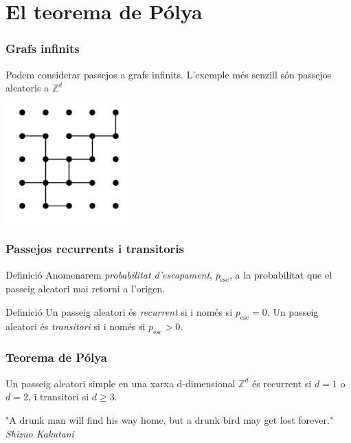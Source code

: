 \documentclass[aspectratio=169, 12pt]{beamer}
\newcommand{\Z}{\mathbb{Z}}
\begin{document}
\section{El teorema de Pólya}
\begin{frame}
	\frametitle{Grafs infinits}
	Podem considerar passejos a grafs infinits. L'exemple més senzill són passejos aleatoris a \( \Z^d \)

	\centering
	\includegraphics[width=50mm]{reticle.png}
\end{frame}

\begin{frame}
	\frametitle{Passejos recurrents i transitoris}
	\begin{block}{Definició}
		Anomenarem \emph{probabilitat d'escapament}, $p_\text{esc}$, a la probabilitat que el passeig aleatori mai retorni a l'origen.
	\end{block} \pause
	\begin{block}{Definició}
		Un passeig aleatori és \emph{recurrent} si i només si $p_\text{esc}=0$. 
		Un passeig aleatori és \emph{transitori} si i només si $p_\text{esc}>0$.
	\end{block}
\end{frame}

\begin{frame}
	\frametitle{Teorema de Pólya}
	\begin{theorem}
		Un passeig aleatori simple en una xarxa d-dimensional $\mathbb{Z}^d$ és recurrent si $d=1$ o $d=2$, i transitori si $d\geq 3$.
	\end{theorem} \pause

	\begin{block}{ }
		"A drunk man will find his way home, but a drunk bird may get lost forever." \\
		\textit{Shizuo Kakutani}
	\end{block}
\end{frame}
\end{document}
